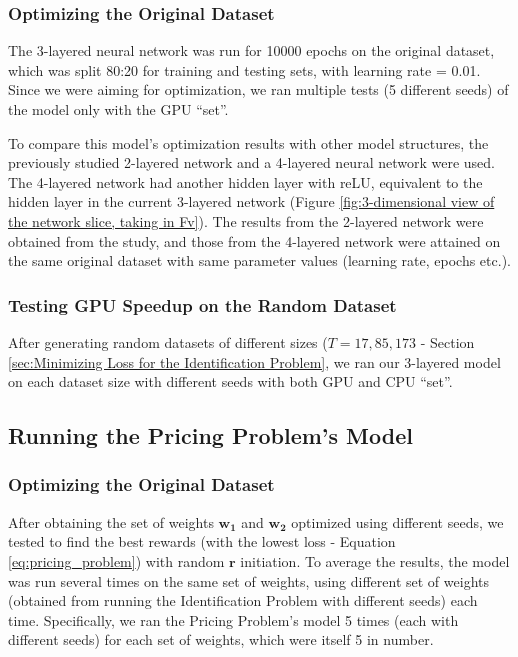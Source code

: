 \documentclass[12pt]{article}
\newcommand{\vect}[1]{\mathbf{#1}}  %
\newcommand{\matr}[1]{\mathbf{#1}}  %
\begin{document}
    \subsubsection{Optimizing the Original Dataset} \label{sec:Identification Problem-Optimizing the Original Dataset}
    The 3-layered neural network was run for 10000 epochs on the original dataset, which was split 80:20 for training and testing sets, with learning rate = 0.01. Since we were aiming for optimization, we ran multiple tests (5 different seeds) of the model only with the GPU ``set''.
    
    To compare this model's optimization results with other model structures, the previously studied 2-layered network \cite{Xue2016Avi2} and a 4-layered neural network were used. The 4-layered network had another hidden layer with reLU, equivalent to the hidden layer in the current 3-layered network (Figure \ref{fig:3-dimensional view of the network slice, taking in Fv}). The results from the 2-layered network were obtained from the study, and those from the 4-layered network were attained on the same original dataset with same parameter values (learning rate, epochs etc.).
    
    \subsubsection{Testing GPU Speedup on the Random Dataset} \label{sec:Identification Problem-Testing GPU Speedup on the Random Dataset}
    After generating random datasets of different sizes ($T = 17, 85, 173$ - Section \ref{sec:Minimizing Loss for the Identification Problem}, we ran our 3-layered model on each dataset size with different seeds with both GPU and CPU ``set''.
    
    \subsection{Running the Pricing Problem's Model} \label{sec:Running the Pricing Problem's Model}
    \subsubsection{Optimizing the Original Dataset} \label{sec:Pricing Problem-Optimizing the Original Dataset}
    After obtaining the set of weights $\matr{w_1}$ and $\matr{w_2}$ optimized using different seeds, we tested to find the best rewards (with the lowest loss - Equation \ref{eq:pricing_problem}) with random $\vect{r}$ initiation. To average the results, the model was run several times on the same set of weights, using different set of weights (obtained from running the Identification Problem with different seeds) each time. Specifically, we ran the Pricing Problem's model 5 times (each with different seeds) for each set of weights, which were itself 5 in number.
    
\end{document}
